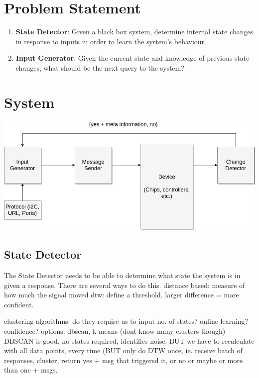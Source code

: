 \documentclass[11pt, a4paper]{article}
\begin{document}
\section*{Problem Statement} 

\begin{enumerate}
    \item \textbf{State Detector}: Given a black box system, determine internal state changes in response to inputs in order to learn the system's behaviour.
    \item \textbf{Input Generator}: Given the current state and knowledge of previous state changes, what should be the next query to the system?
\end{enumerate}

\section*{System}

\includegraphics[scale=0.5]{Fuzzer.png}

\subsection*{State Detector}
The State Detector needs to be able to determine what state the system is in given a response.
There are several ways to do this.
distance based: measure of how much the signal moved
dtw: define a threshold. larger difference = more confident.

clustering algorithms: do they require us to input no. of states? online learning? confidence?
options: dbscan, k means (dont know many clusters though)
DBSCAN is good, no states required, identifies noise. BUT we have to recalculate with all data points, every time (BUT only do DTW once, ie. 
receive batch of responses, cluster, return yes + msg that triggered it, or no or maybe or more than one + msgs.
\end{document}
